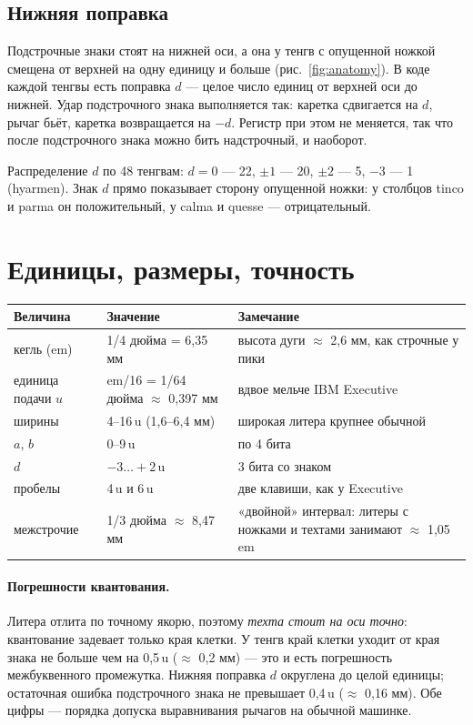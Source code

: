 \documentclass[11pt,a4paper]{article}
\begin{document}
\subsection{Нижняя поправка}

Подстрочные знаки стоят на нижней оси, а она у тенгв с опущенной ножкой смещена от верхней на одну единицу и больше (рис.~\ref{fig:anatomy}). В коде каждой тенгвы есть поправка $d$ — целое число единиц от верхней оси до нижней. Удар подстрочного знака выполняется так: каретка сдвигается на $d$, рычаг бьёт, каретка возвращается на $-d$. Регистр при этом не меняется, так что после подстрочного знака можно бить надстрочный, и наоборот.

Распределение $d$ по 48 тенгвам: $d=0$ — 22, $\pm 1$ — 20, $\pm 2$ — 5, $-3$ — 1 (hyarmen). Знак $d$ прямо показывает сторону опущенной ножки: у столбцов tinco и parma он положительный, у calma и quesse — отрицательный.

\section{Единицы, размеры, точность}

\begin{center}\small
\begin{tabular}{@{}lll@{}}
\toprule
Величина & Значение & Замечание \\
\midrule
кегль (em) & 1/4 дюйма = 6,35 мм & высота дуги $\approx$ 2,6 мм, как строчные у пики \\
единица подачи $u$ & em/16 = 1/64 дюйма $\approx$ 0,397 мм & вдвое мельче IBM Executive \\
ширины & 4--16\,u (1,6--6,4 мм) & широкая литера крупнее обычной \\
$a$, $b$ & 0--9\,u & по 4 бита \\
$d$ & $-3\ldots+2$\,u & 3 бита со знаком \\
пробелы & 4\,u и 6\,u & две клавиши, как у Executive \\
межстрочие & 1/3 дюйма $\approx$ 8,47 мм & «двойной» интервал: литеры с ножками и техтами занимают $\approx$ 1,05 em \\
\bottomrule
\end{tabular}
\end{center}

\paragraph{Погрешности квантования.} Литера отлита по точному якорю, поэтому \emph{техта стоит на оси точно}: квантование задевает только края клетки. У тенгв край клетки уходит от края знака не больше чем на 0,5\,u ($\approx$ 0,2 мм) — это и есть погрешность межбуквенного промежутка. Нижняя поправка $d$ округлена до целой единицы; остаточная ошибка подстрочного знака не превышает 0,4\,u ($\approx$ 0,16 мм). Обе цифры — порядка допуска выравнивания рычагов на обычной машинке.
\end{document}
